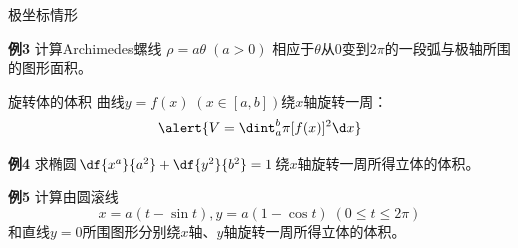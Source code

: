 \begin{frame}{极坐标情形}
	\linespread{1.2}\pause 
	\begin{exampleblock}{{\bf 例3}\hfill}
		计算Archimedes螺线
		$\rho=a\theta\;(a>0)$
		相应于$\theta$从$0$变到$2\pi$的一段弧与极轴所围的图形面积。
	\end{exampleblock}\pause 
	\begin{center}
	\end{center}
\end{frame}

\begin{frame}{旋转体的体积}
	\linespread{1.8}\pause 
	{\bb 曲线$y=f(x)\;(x\in[a,b])$绕$x$轴旋转一周：}\pause
	$$\alert{V=\dint_a^b\pi[f(x)]^2\d x}$$
	\pause
	\begin{exampleblock}{{\bf 例4}\hfill}
		求椭圆$\df{x^a}{a^2}+\df{y^2}{b^2}=1$绕$x$轴旋转一周所得立体的体积。
	\end{exampleblock}
\end{frame}

\begin{frame}
	\linespread{1.2}
	\begin{exampleblock}{{\bf 例5}\hfill}
		计算由圆滚线$$x=a(t-\sin t),y=a(1-\cos t)\;(0\leq t\leq 2\pi)$$
		和直线$y=0$所围图形分别绕$x$轴、$y$轴旋转一周所得立体的体积。
	\end{exampleblock}
\end{frame}


